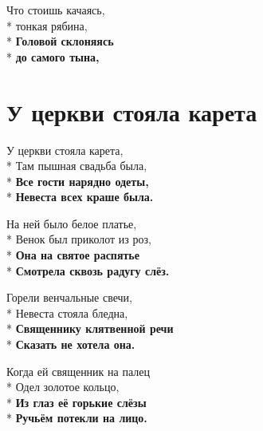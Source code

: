 \medskip

\begin{minipage}{\linewidth}
Что стоишь качаясь,\\*
тонкая рябина,\\*
\textbf{Головой склоняясь}\\*
\textbf{до самого тына,}\\
\end{minipage}

\vspace{\fill}\newpage

\section{У церкви стояла карета}
\label{song:У_церкви_стояла_карета}

\medskip

\begin{minipage}{\linewidth}
У церкви стояла карета,\\*
Там пышная свадьба была,\\*
\textbf{Все гости нарядно одеты,}\\*
\textbf{Невеста всех краше была.}\\
\end{minipage}\par\medskip\nobreak

\medskip

\begin{minipage}{\linewidth}
На ней было белое платье,\\*
Венок был приколот из роз,\\*
\textbf{Она на святое распятье}\\*
\textbf{Смотрела сквозь радугу слёз.}\\
\end{minipage}\par\medskip\nobreak

\medskip

\begin{minipage}{\linewidth}
Горели венчальные свечи,\\*
Невеста стояла бледна,\\*
\textbf{Священнику клятвенной речи}\\*
\textbf{Сказать не хотела она.}\\
\end{minipage}\par\medskip\nobreak

\medskip

\begin{minipage}{\linewidth}
Когда ей священник на палец\\*
Одел золотое кольцо,\\*
\textbf{Из глаз её горькие слёзы}\\*
\textbf{Ручьём потекли на лицо.}\\
\end{minipage}\par\medskip\nobreak

